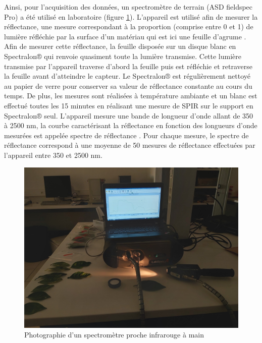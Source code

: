 \documentclass[
  11pt,
  french,
  a4paper,
  extrafontsizes,onecolumn,openright
  ]{memoir}
\begin{document}
\normalsize

Ainsi, pour l'acquisition des données, un spectromètre de terrain (ASD fieldspec Pro) a été utilisé en laboratoire (figure \ref{fig:9}). L'appareil est utilisé afin de mesurer la réflectance, une mesure correspondant à la proportion (comprise entre 0 et 1) de lumière réfléchie par la surface d'un matériau qui est ici une feuille d'agrume \autocite{comar_etude_2013}.
Afin de mesurer cette réflectance, la feuille disposée sur un disque blanc en Spectralon® qui renvoie quasiment toute la lumière transmise. Cette lumière transmise par l'appareil traverse d'abord la feuille puis est réfléchie et retraverse la feuille avant d'atteindre le capteur. Le Spectralon® est régulièrement nettoyé au papier de verre pour conserver sa valeur de réflectance constante au cours du temps. De plus, les mesures sont réalisées à température ambiante et un blanc est effectué toutes les 15 minutes en réalisant une mesure de SPIR sur le support en Spectralon® seul. L'appareil mesure une bande de longueur d'onde allant de 350 à 2500 nm, la courbe caractérisant la réflectance en fonction des longueurs d'onde mesurées est appelée spectre de réflectance \autocite{comar_etude_2013}.
Pour chaque mesure, le spectre de réflectance correspond à une moyenne de 50 mesures de réflectance effectuées par l'appareil entre 350 et 2500 nm.

\scriptsize

\begin{figure}

{\centering \includegraphics[width=0.8\linewidth]{Images/Figure9} 

}

\caption{Photographie d’un spectromètre proche infrarouge à main}\label{fig:9}
\end{figure}
\end{document}
